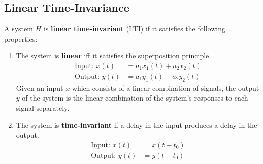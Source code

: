 \documentclass{article}
\begin{document}
\subsection{Linear Time-Invariance}
A system \(H\) is \textbf{linear time-invariant} (LTI) if it satisfies
the following properties:
\begin{enumerate}
    \item The system is \textbf{linear} iff it satisfies the
          superposition principle.
          \begin{align*}
              \text{Input: } x\left( t \right)  & = a_1 x_1\left( t \right) + a_2 x_2\left( t \right) \\
              \text{Output: } y\left( t \right) & = a_1 y_1\left( t \right) + a_2 y_2\left( t \right)
          \end{align*}
          Given an input \(x\) which consists of a linear combination of signals,
          the output \(y\) of the system is the linear combination of the system's responses to each signal separately.
    \item The system is \textbf{time-invariant} if a delay in the input
          produces a delay in the output.
          \begin{align*}
              \text{Input: } x\left( t \right)  & = x\left( t - t_0 \right) \\
              \text{Output: } y\left( t \right) & = y\left( t - t_0 \right)
          \end{align*}
\end{enumerate}
\end{document}
